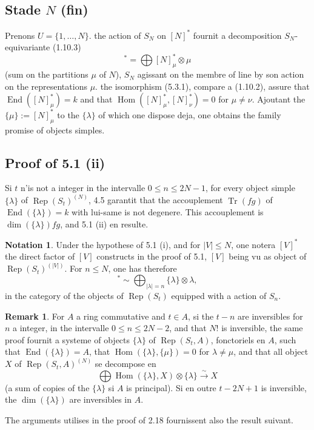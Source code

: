 \documentclass[11pt,a4paper]{article}
\theoremstyle{plain}
\theoremstyle{definition}
\newtheorem{remark}[theorem]{Remark}
\newtheorem{notation}[theorem]{Notation}
\DeclareMathOperator{\Hom}{Hom}
\DeclareMathOperator{\End}{End}
\DeclareMathOperator{\Tr}{Tr}
\DeclareMathOperator{\Rep}{Rep}
\newcommand{\isom}{\xrightarrow{\sim}}
\begin{document}
\subsection{Stade $N$ (fin)}
Prenons $U = \{1, \ldots, N\}$. the action of $S_N$ on $[N]^*$ fournit a decomposition $S_N$-equivariante (1.10.3)
\begin{equation}
[N]^* = \bigoplus [N]^*_{\mu} \otimes \mu \tag{5.3.1}
\end{equation}
(sum on the partitions $\mu$ of $N$), $S_N$ agissant on the membre of line by son action on the representations $\mu$. the isomorphism (5.3.1), compare a (1.10.2), assure that $\End([N]^*_{\mu}) = k$ and that $\Hom([N]^*_{\mu}, [N]^*_{\nu}) = 0$ for $\mu \neq \nu$. Ajoutant the $\{\mu\} := [N]^*_{\mu}$ to the $\{\lambda\}$ of which one dispose deja, one obtains the family promise of objects simples.

\subsection{Proof of 5.1 (ii)}
Si $t$ n'is not a integer in the intervalle $0 \leq n \leq 2N-1$, for every object simple $\{\lambda\}$ of $\Rep(S_t)^{(N)}$, 4.5 garantit that the accouplement $\Tr(fg)$ of $\End(\{\lambda\}) = k$ with lui-same is not degenere. This accouplement is $\dim(\{\lambda\}) fg$, and 5.1 (ii) en resulte.

\begin{notation}
Under the hypothese of 5.1 (i), and for $|V| \leq N$, one notera $[V]^*$ the direct factor of $[V]$ constructs in the proof of 5.1, $[V]$ being vu as object of $\Rep(S_t)^{(|V|)}$. For $n \leq N$, one has therefore
\begin{equation}
[n]^* \sim \bigoplus_{|\lambda| = n} \{\lambda\} \otimes \lambda, \tag{5.5.1}
\end{equation}
in the category of the objects of $\Rep(S_t)$ equipped with a action of $S_n$.
\end{notation}

\begin{remark}
For $A$ a ring commutative and $t \in A$, si the $t-n$ are inversibles for $n$ a integer, in the intervalle $0 \leq n \leq 2N-2$, and that $N!$ is inversible, the same proof fournit a systeme of objects $\{\lambda\}$ of $\Rep(S_t, A)$, fonctoriels en $A$, such that $\End(\{\lambda\}) = A$, that $\Hom(\{\lambda\}, \{\mu\}) = 0$ for $\lambda \neq \mu$, and that all object $X$ of $\Rep(S_t, A)^{(N)}$ se decompose en
\begin{equation}
\bigoplus \Hom(\{\lambda\}, X) \otimes \{\lambda\} \isom X \tag{5.6.1}
\end{equation}
(a sum of copies of the $\{\lambda\}$ si $A$ is principal). Si en outre $t - 2N + 1$ is inversible, the $\dim(\{\lambda\})$ are inversibles in $A$.

The arguments utilises in the proof of 2.18 fournissent also the result suivant.
\end{remark}
\end{document}

